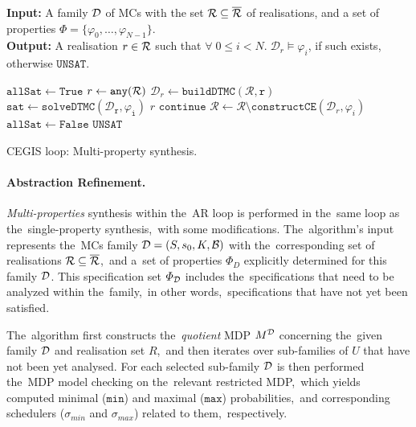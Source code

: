 \begin{algorithm}[h!]
\hspace*{\algorithmicindent} \textbf{Input:} A family $\mathcal{D}$ of MCs with the set $\mathcal{R} \subseteq \overline{\mathcal{R}}$ of realisations, and a set of properties $\varPhi = \{ \varphi_0, \dots, \varphi_{N-1} \}$. \\
\hspace*{\algorithmicindent} \textbf{Output:}  A realisation $r \in \mathcal{R}$ such that $\forall \; 0 \leq i < N. \; \mathcal{D}_r \models \varphi_i$, if such exists, otherwise $\mathtt{UNSAT}$. \\
\vspace*{-1.5em}
\begin{algorithmic}[1]
    \WHILE{$\rlz \neq \emptyset$}
        \STATE $\mathtt{allSat} \leftarrow \mathtt{True}$
        \STATE $r \leftarrow \mathtt{any(\mathcal{R})}$
        \STATE $\mathcal{D}_r\leftarrow \mathtt{buildDTMC(\mathcal{R}, r)}$
            \STATE $\mathtt{sat} \leftarrow \mathtt{solveDTMC(\mathcal{D}_r, \varphi_{i})}$
                    \RETURN $r$
                \ELSE
                    \STATE $\mathtt{continue}$
                \ENDIF
            \ELSE
                \STATE $\mathcal{R} \leftarrow \mathcal{R} \setminus \mathtt{constructCE}(\mathcal{D}_r, \varphi_{i})$
                \STATE $\mathtt{allSat} \leftarrow \mathtt{False}$
            \ENDIF
        \ENDFOR
    \ENDWHILE
    \RETURN $\mathtt{UNSAT}$
\end{algorithmic}
\caption{CEGIS loop: Multi-property synthesis.}
\label{alg:cegis_multi}
\end{algorithm}

\paragraph{Abstraction Refinement.}
\textit{Multi-properties} synthesis within the~AR loop is performed in the~same loop as the~single-property synthesis,~with some modifications.
The~algorithm's input represents the~MCs family $\mathcal{D} = (S,s_{0},K,\mathcal{B})$ with the~corresponding set of realisations $\mathcal{R} \subseteq \overline{\mathcal{R}}$,~and a~set of properties $\varPhi_D$ explicitly determined for this family $\mathcal{D}$.
This specification set $\varPhi_{\mathcal{D}}$ includes the~specifications that need to be analyzed within the~family,~in other words,~specifications that have not yet been satisfied.

The~algorithm first constructs the~\textit{quotient} MDP $M^{\mathcal{D}}$ concerning the~given family $\mathcal{D}$ and realisation set $R$,~and then iterates over sub-families of $U$ that have not been yet analysed.
For each selected sub-family $\mathcal{D}$ is then performed the~MDP model checking on the~relevant restricted MDP,~which yields computed minimal ($\mathtt{min}$) and maximal ($\mathtt{max}$) probabilities,~and corresponding schedulers ($\sigma_{min}$ and $\sigma_{max}$) related to them,~respectively.

